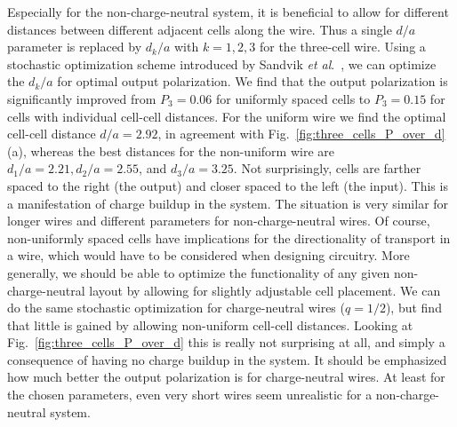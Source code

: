 Especially for the non-charge-neutral system, it is beneficial to allow for
different distances between different adjacent cells along the wire. Thus a
single $d/a$ parameter is replaced by $d_k/a$ with $k = 1,2,3$ for the
three-cell wire. Using a stochastic optimization scheme introduced by Sandvik
\emph{et al}.\ \cite{Sandvik2007}, we can optimize the $d_k/a$ for optimal
output polarization. We find that the output polarization is significantly
improved from $P_3 = 0.06$ for uniformly spaced cells to $P_3 = 0.15$ for cells
with individual cell-cell distances. For the uniform wire we find the optimal
cell-cell distance $d/a = 2.92$, in agreement with
Fig.~\ref{fig:three_cells_P_over_d}(a), whereas the best distances for the
non-uniform wire are $d_1/a = 2.21, d_2/a = 2.55$, and $d_3/a = 3.25$. 
Not surprisingly, cells are farther spaced
to the right (the output) and closer spaced to the left (the input). This is a
manifestation of charge buildup in the system. The situation is very similar for
longer wires and different parameters for non-charge-neutral wires. Of course,
non-uniformly spaced cells have implications for the directionality of
transport in a wire, which would have to be considered when designing 
circuitry. More generally, we should be able to optimize the functionality of
any given non-charge-neutral  layout by allowing for slightly
adjustable cell placement. We can do the same stochastic optimization for
charge-neutral wires ($q=1/2$), but find that little is gained by allowing
non-uniform cell-cell distances. Looking at Fig.~\ref{fig:three_cells_P_over_d}
this is really not surprising at all, and simply a consequence of having no
charge buildup in the system. It should be emphasized how much better the output
polarization is for charge-neutral wires. At least for the chosen parameters,
even very short wires seem unrealistic for a non-charge-neutral system.

